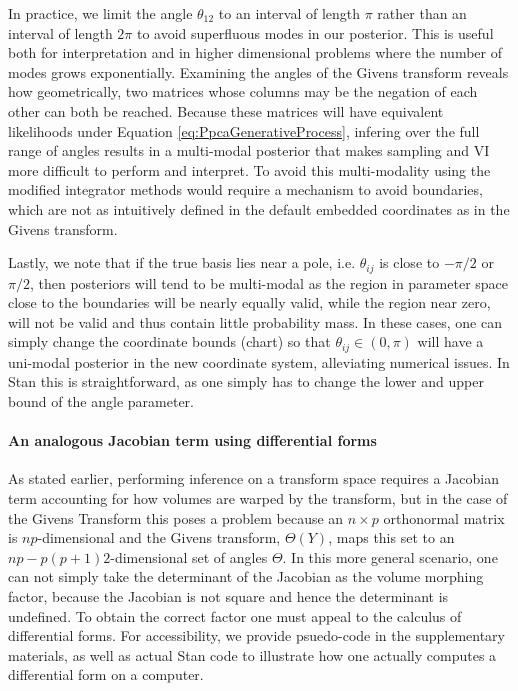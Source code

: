 \documentclass{article}
\begin{document}
In practice, we limit the angle $\theta_{12}$ to an interval of length $\pi$ rather than an interval of length $2\pi$ to avoid superfluous modes in our posterior. This is useful both for interpretation and in higher dimensional problems where the number of modes grows exponentially. Examining the angles of the Givens transform reveals how geometrically, two matrices whose columns may be the negation of each other can both be reached. Because these matrices will have equivalent likelihoods under Equation \ref{eq:PpcaGenerativeProcess}, infering over the full range of angles results in a multi-modal posterior that makes sampling and VI more difficult to perform and interpret. To avoid this multi-modality using the modified integrator methods would require a mechanism to avoid boundaries, which are not as intuitively defined in the default embedded coordinates as in the Givens transform.

Lastly, we note that if the true basis lies near a pole, i.e. $\theta_{ij}$ is close to $-\pi/2$ or $\pi/2$, then posteriors will tend to be multi-modal as the region in parameter space close to the boundaries will be nearly equally valid, while the region near zero, will not be valid and thus contain little probability mass. In these cases, one can simply change the coordinate bounds (chart) so that $\theta_{ij} \in (0, \pi)$ will have a uni-modal posterior in the new coordinate system, alleviating numerical issues. In Stan this is straightforward, as one simply has to change the lower and upper bound of the angle parameter.

\paragraph{An analogous Jacobian term using differential forms} As stated earlier, performing inference on a transform space requires a Jacobian term accounting for how volumes are warped by the transform, but in the case of the Givens Transform this poses a problem because an $n \times p$ orthonormal matrix is $np$-dimensional and the Givens transform, $\Theta(Y)$, maps this set to an $np - p(p+1)2$-dimensional set of angles $\Theta$. In this more general scenario, one can not simply take the determinant of the Jacobian as the volume morphing factor, because the Jacobian is not square and hence the determinant is undefined. To obtain the correct factor one must appeal to the calculus of differential forms. For accessibility, we provide psuedo-code in the supplementary materials, as well as actual Stan code to illustrate how one actually computes a differential form on a computer.
\end{document}

